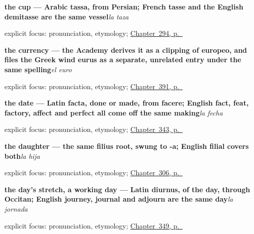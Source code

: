 \noindent\begin{minipage}[t]{\linewidth}
\raggedright
\textbf{the cup — Arabic tassa, from Persian; French tasse and the English demitasse are the same vessel}\enspace\emph{la taza}\par
\footnotesize explicit focus: pronunciation, etymology; \hyperref[ch:cinco-cosas-mas]{Chapter~294, p.~\pageref*{ch:cinco-cosas-mas}}
\end{minipage}\par\smallskip

\noindent\begin{minipage}[t]{\linewidth}
\raggedright
\textbf{the currency — the Academy derives it as a clipping of europeo, and files the Greek wind eurus as a separate, unrelated entry under the same spelling}\enspace\emph{el euro}\par
\footnotesize explicit focus: pronunciation, etymology; \hyperref[ch:el-menu-y-el-camarero]{Chapter~391, p.~\pageref*{ch:el-menu-y-el-camarero}}
\end{minipage}\par\smallskip

\noindent\begin{minipage}[t]{\linewidth}
\raggedright
\textbf{the date — Latin facta, done or made, from facere; English fact, feat, factory, affect and perfect all come off the same making}\enspace\emph{la fecha}\par
\footnotesize explicit focus: pronunciation, etymology; \hyperref[ch:la-fecha-y-el-siglo]{Chapter~343, p.~\pageref*{ch:la-fecha-y-el-siglo}}
\end{minipage}\par\smallskip

\noindent\begin{minipage}[t]{\linewidth}
\raggedright
\textbf{the daughter --- the same filius root, swung to -a; English filial covers both}\enspace\emph{la hija}\par
\footnotesize explicit focus: pronunciation, etymology; \hyperref[ch:hijos-y-abuelos]{Chapter~306, p.~\pageref*{ch:hijos-y-abuelos}}
\end{minipage}\par\smallskip

\noindent\begin{minipage}[t]{\linewidth}
\raggedright
\textbf{the day's stretch, a working day — Latin diurnus, of the day, through Occitan; English journey, journal and adjourn are the same day}\enspace\emph{la jornada}\par
\footnotesize explicit focus: pronunciation, etymology; \hyperref[ch:la-jornada-y-la-decada]{Chapter~349, p.~\pageref*{ch:la-jornada-y-la-decada}}
\end{minipage}\par\smallskip

